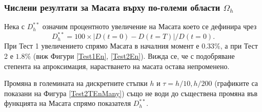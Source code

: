 \documentclass[a4paper]{article}
\newcommand{\be}{\begin{equation}}
\newcommand{\ee}{\end{equation}}
\theoremstyle{remark}
\begin{document}
\begin{large}
\subsubsection{Числени резултати за Масата върху по-големи области $\Omega_h$}
Нека с $D_h^{**}$ означим процентното увеличение на Масата което се дефинира чрез
\be
D_h^{**} = 100 \times |D(t=0) - D(t=T)|/D(t=0).
\ee
При Тест 1 увеличението спрямо Масата в началния момент е $0.33\%$, а при Тест 2 е $1.8\%$ (виж Фигури \ref{Test1En}, \ref{Test2En}). Вижда се, че с подобряване степента на апроксимация, нарастването на масата остава непроменено. 

Промяна в големината на дискретните стъпки $h$ и $\tau=h/10, h/200$ (графиките са показани на Фигура \ref{Test2TEnMany}) също не води до съществена промяна във функцията на Масата спрямо показателя $D_h^{**}$. 


\end{large}
\end{document}
